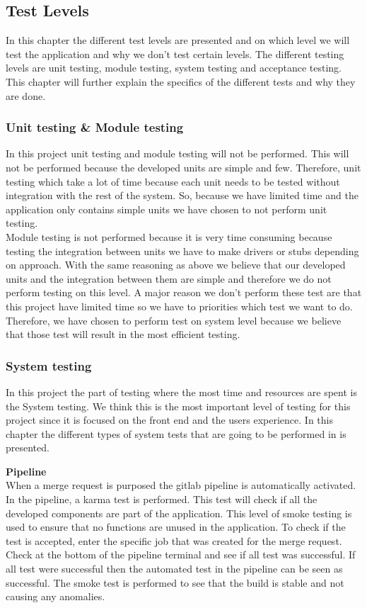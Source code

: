 \subsection{Test Levels}
In this chapter the different test levels are presented and on which level we will test the application and why we don't test certain levels. The different testing levels are unit testing, module testing, system testing and acceptance testing. This chapter will further explain the specifics of the different tests and why they are done.

\subsubsection{Unit testing \& Module testing}
In this project unit testing and module testing will not be performed. This will not be performed because the developed units are simple and few. Therefore, unit testing which take a lot of time because each unit needs to be tested without integration with the rest of the system. So, because we have limited time and the application only contains simple units we have chosen to not perform unit testing. \\

\noindent Module testing is not performed because it is very time consuming because testing the integration between units we have to make drivers or stubs depending on approach. With the same reasoning as above we believe that our developed units and the integration between them are simple and therefore we do not perform testing on this level. A major reason we don't perform these test are that this project have limited time so we have to priorities which test we want to do. Therefore, we have chosen to perform test on system level because we believe that those test will result in the most efficient testing. 

\subsubsection{System testing}
In this project the part of testing where the most time and resources are spent is the System testing. We think this is the most important level of testing for this project since it is focused on the front end and the users experience. In this chapter the different types of system tests that are going to be performed in is presented. \newline

\noindent \textbf{Pipeline}\\
When a merge request is purposed the gitlab pipeline is automatically activated. In the pipeline, a karma test is performed. This test will check if all the developed components are part of the application. This level of smoke testing is used to ensure that no functions are unused in the application. To check if the test is accepted, enter the specific job that was created for the merge request. Check at the bottom of the pipeline terminal and see if all test was successful. If all test were successful then the automated test in the pipeline can be seen as successful. The smoke test is performed to see that the build is stable and not causing any anomalies.\\ 

